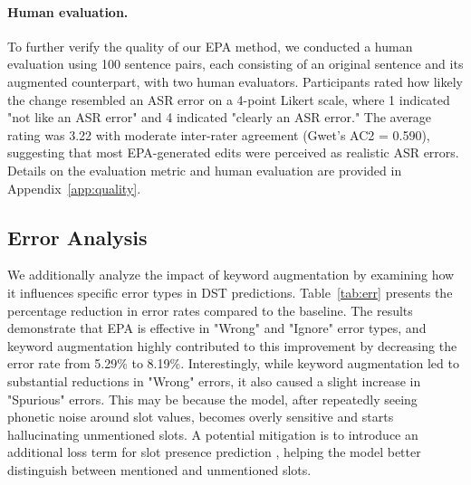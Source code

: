 \paragraph{Human evaluation.} To further verify the quality of our EPA method, we conducted a human evaluation using 100 sentence pairs, each consisting of an original sentence and its augmented counterpart, with two human evaluators. Participants rated how likely the change resembled an ASR error on a 4-point Likert scale, where 1 indicated "not like an ASR error" and 4 indicated "clearly an ASR error." The average rating was 3.22 with moderate inter-rater agreement   (Gwet’s AC2 \cite{gwet} = 0.590), suggesting that most EPA-generated edits were perceived as realistic ASR errors. Details on the evaluation metric and human evaluation are provided in Appendix~\ref{app:quality}.


\subsection{Error Analysis}


We additionally analyze the impact of keyword augmentation by examining how it influences specific error types in DST predictions. Table~\ref{tab:err} presents the percentage reduction in error rates compared to the baseline. The results demonstrate that EPA is effective in "Wrong" and "Ignore" error types, and keyword augmentation highly contributed to this improvement by decreasing the error rate from 5.29\% to 8.19\%. Interestingly, while keyword augmentation led to substantial reductions in "Wrong" errors, it also caused a slight increase in "Spurious" errors. This may be because the model, after repeatedly seeing phonetic noise around slot values, becomes overly sensitive and starts hallucinating unmentioned slots. A potential mitigation is to introduce an additional loss term for slot presence prediction \cite{trippy,kim2019efficient} , helping the model better distinguish between mentioned and unmentioned slots.




